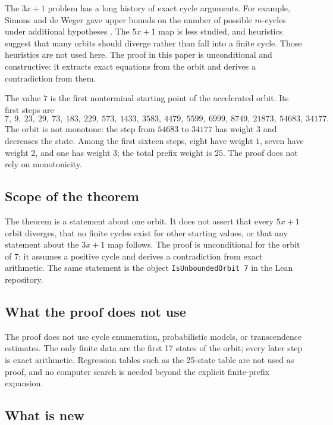 The $3x+1$ problem has a long history of exact cycle arguments.  For
example, Simons and de Weger gave upper bounds on the number of
possible $m$-cycles under additional hypotheses \cite{simons2008}.
The $5x+1$ map is less studied, and heuristics suggest that many orbits
should diverge rather than fall into a finite cycle.  Those heuristics
are not used here.  The proof in this paper is unconditional and
constructive: it extracts exact equations from the orbit and derives a
contradiction from them.

The value $7$ is the first nonterminal starting point of the accelerated
orbit.  Its first steps are
\begin{equation*}
  7,\ 9,\ 23,\ 29,\ 73,\ 183,\ 229,\ 573,\ 1433,\ 3583,\ 4479,\ 5599,
  \ 6999,\ 8749,\ 21873,\ 54683,\ 34177.
\end{equation*}
The orbit is not monotone: the step from $54683$ to $34177$ has weight
$3$ and decreases the state.  Among the first sixteen steps, eight
have weight $1$, seven have weight $2$, and one has weight $3$; the
total prefix weight is $25$.  The proof does not rely on monotonicity.

\subsection{Scope of the theorem}

The theorem is a statement about one orbit.  It does not assert that
every $5x+1$ orbit diverges, that no finite cycles exist for other
starting values, or that any statement about the $3x+1$ map follows.
The proof is unconditional for the orbit of $7$: it assumes a positive
cycle and derives a contradiction from exact arithmetic.  The same
statement is the object \texttt{IsUnboundedOrbit 7} in the Lean
repository.

\subsection{What the proof does not use}

The proof does not use cycle enumeration, probabilistic models, or
transcendence estimates.  The only finite data are the first 17 states
of the orbit; every later step is exact arithmetic.  Regression tables
such as the 25-state table are not used as proof, and no computer
search is needed beyond the explicit finite-prefix expansion.

\subsection{What is new}

